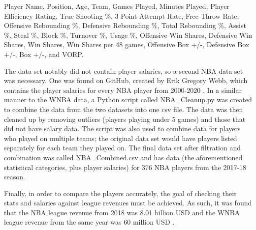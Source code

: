 \documentclass[12pt]{article}
\begin{document}
\newline
\par
Player Name, Position, Age, Team, Games Played, Minutes Played, Player Efficiency Rating, True Shooting \%, 3 Point Attempt Rate, Free Throw Rate, Offensive Rebounding \%, Defensive Rebounding \%, Total Rebounding \%, Assist \%, Steal \%, Block \%, Turnover \%, Usage \%, Offensive Win Shares, Defensive Win Shares, Win Shares, Win Shares per 48 games, Offensive Box +/-, Defensive Box +/-, Box +/-, and VORP.
\newline
\par
The data set notably did not contain player salaries, so a second NBA data set was necessary. One was found on GitHub, created by Erik Gregory Webb, which contains the player salaries for every NBA player from 2000-2020 \cite{nba_salaries}. In a similar manner to the WNBA data, a Python script called NBA\_Cleanup.py was created to combine the data from the two datasets into one csv file. The data was then cleaned up by removing outliers (players playing under 5 games) and those that did not have salary data. The script was also used to combine data for players who played on multiple teams; the original data set would have players listed separately for each team they played on. The final data set after filtration and combination was called NBA\_Combined.csv and has data (the aforementioned statistical categories, plus player salaries) for 376 NBA players from the 2017-18 season.
\par
Finally, in order to compare the players accurately, the goal of checking their stats and salaries against league revenues must be achieved. As such, it was found that the NBA league revenue from 2018 was 8.01 billion USD \cite{NBA_Revenue} and the WNBA league revenue from the same year was 60 million USD \cite{WNBA_Revenue}.
\end{document}
